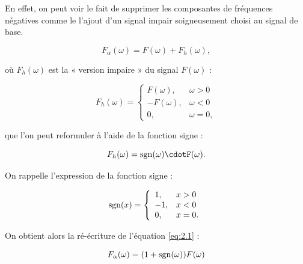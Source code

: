 En effet, on peut voir le fait de supprimer les composantes de fréquences négatives comme le l'ajout d'un signal impair soigneusement choisi au signal de base.

\begin{equation} \label{eq:2.1}
    F_{\alpha}(\omega) = F(\omega) + F_h(\omega),
\end{equation}

où $F_h(\omega)$ est la « version impaire » du signal $F(\omega)$ :

\begin{equation}
    F_h(\omega) = \left\{
    \begin{array}{ll}
        F(\omega), & \omega > 0 \\
        -F(\omega), & \omega < 0 \\
        0, & \omega = 0,
    \end{array}
    \right.
\end{equation}

que l'on peut reformuler à l'aide de la fonction signe :

\begin{equation}
    F_h(\omega) = \sgn(\omega)\cdotF(\omega).
    \label{eq:2.5}
\end{equation}

On rappelle l'expression de la fonction signe :

\begin{equation}
    \operatorname{sgn}(x) = \left\{
    \begin{array}{ll}
        1, & x > 0 \\
        -1, & x < 0 \\
        0, & x = 0.
    \end{array}
    \right.
\end{equation}

On obtient alors la ré-écriture de l'équation \ref{eq:2.1} :

\begin{equation}
    F_{\alpha}(\omega) = (1+\operatorname{sgn}(\omega))F(\omega)
\end{equation}

